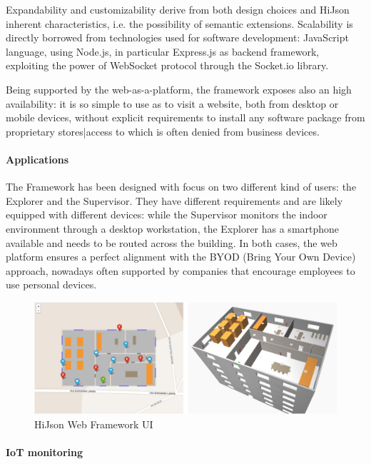 \documentclass{sig-alternate}
\begin{document}
Expandability and customizability derive from both design choices and HiJson inherent characteristics, i.e. the possibility of semantic extensions. Scalability is directly borrowed from technologies used for software development: JavaScript language, using Node.js, in particular Express.js as backend framework, exploiting the power of WebSocket protocol through the Socket.io library.

Being supported by the web-as-a-platform, the framework exposes also an high availability: it is so simple to use as to visit a website, both from desktop or mobile devices, without explicit requirements to install any software package from proprietary stores|access to which is often denied from business devices.

\paragraph{Applications}

The Framework has been designed with focus on two different kind of users: the Explorer and the Supervisor. They have different requirements and are likely equipped with different devices: while the Supervisor monitors the indoor environment through a desktop workstation, the Explorer has a smartphone available and needs to be routed across the building.
In both cases, the web platform ensures a perfect alignment with the BYOD (Bring Your Own Device) approach, nowadays often supported by companies that encourage employees to use personal devices.


\begin{figure}[htb]
\centering
\includegraphics[width=\linewidth]{../images/2D-3D}
\caption{HiJson Web Framework UI}
\label{fig:web-framework-ui}
\end{figure}

\paragraph{IoT monitoring}
\end{document}
